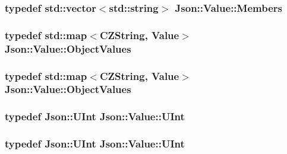 \hypertarget{classJson_1_1Value_ac61bab5a465848b57610379cc07995c3}{
\subsubsection[{Members}]{\setlength{\rightskip}{0pt plus 5cm}typedef std\-::vector$<$std\-::string$>$ {\bf Json\-::\-Value\-::\-Members}}}\label{d1/db8/classJson_1_1Value_ac61bab5a465848b57610379cc07995c3}
\hypertarget{classJson_1_1Value_a08b6c80c3af7071d908dabf044de5388}{
\subsubsection[{Object\-Values}]{\setlength{\rightskip}{0pt plus 5cm}typedef std\-::map$<${\bf C\-Z\-String}, {\bf Value}$>$ {\bf Json\-::\-Value\-::\-Object\-Values}}}\label{d1/db8/classJson_1_1Value_a08b6c80c3af7071d908dabf044de5388}
\hypertarget{classJson_1_1Value_a08b6c80c3af7071d908dabf044de5388}{
\subsubsection[{Object\-Values}]{\setlength{\rightskip}{0pt plus 5cm}typedef std\-::map$<${\bf C\-Z\-String}, {\bf Value}$>$ {\bf Json\-::\-Value\-::\-Object\-Values}}}\label{d1/db8/classJson_1_1Value_a08b6c80c3af7071d908dabf044de5388}
\hypertarget{classJson_1_1Value_a0933d59b45793ae4aade1757c322a98d}{
\subsubsection[{U\-Int}]{\setlength{\rightskip}{0pt plus 5cm}typedef {\bf Json\-::\-U\-Int} {\bf Json\-::\-Value\-::\-U\-Int}}}\label{d1/db8/classJson_1_1Value_a0933d59b45793ae4aade1757c322a98d}
\hypertarget{classJson_1_1Value_a0933d59b45793ae4aade1757c322a98d}{
\subsubsection[{U\-Int}]{\setlength{\rightskip}{0pt plus 5cm}typedef {\bf Json\-::\-U\-Int} {\bf Json\-::\-Value\-::\-U\-Int}}}\label{d1/db8/classJson_1_1Value_a0933d59b45793ae4aade1757c322a98d}


